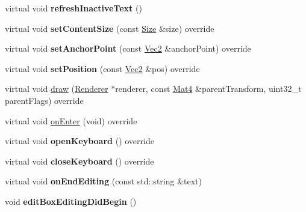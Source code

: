 \begin{DoxyCompactItemize}
virtual void {\bfseries refresh\+Inactive\+Text} ()
\item 
\mbox{\label{classui_1_1EditBoxImplCommon_a924b2b710c323759223e37d03998a4d1}} 
virtual void {\bfseries set\+Content\+Size} (const \hyperlink{classSize}{Size} \&size) override
\item 
\mbox{\label{classui_1_1EditBoxImplCommon_a0ac6bf4e36e02e29fae142b5c72e987f}} 
virtual void {\bfseries set\+Anchor\+Point} (const \hyperlink{classVec2}{Vec2} \&anchor\+Point) override
\item 
\mbox{\label{classui_1_1EditBoxImplCommon_a5d432d7249a3f36d2f73b111a89b5898}} 
virtual void {\bfseries set\+Position} (const \hyperlink{classVec2}{Vec2} \&pos) override
\item 
virtual void \hyperlink{classui_1_1EditBoxImplCommon_a7a0f13f9b474b83b43aa357a3fd123ca}{draw} (\hyperlink{classRenderer}{Renderer} $\ast$renderer, const \hyperlink{classMat4}{Mat4} \&parent\+Transform, uint32\+\_\+t parent\+Flags) override
\item 
virtual void \hyperlink{classui_1_1EditBoxImplCommon_af69080c62e8be3ded9074a1e891761e7}{on\+Enter} (void) override
\item 
\mbox{\label{classui_1_1EditBoxImplCommon_a7d61be98949f6b9c82665dde11068613}} 
virtual void {\bfseries open\+Keyboard} () override
\item 
\mbox{\label{classui_1_1EditBoxImplCommon_aab5ebed20a681171de342107d87419d2}} 
virtual void {\bfseries close\+Keyboard} () override
\item 
\mbox{\label{classui_1_1EditBoxImplCommon_a1df95d5a9ac8f68b183e2ed165440027}} 
virtual void {\bfseries on\+End\+Editing} (const std\+::string \&text)
\item 
\mbox{\label{classui_1_1EditBoxImplCommon_adbe1629e82e8aa3ff37151e0ef75de5d}} 
void {\bfseries edit\+Box\+Editing\+Did\+Begin} ()
\item 
\mbox{\label{classui_1_1EditBoxImplCommon_a7c70d9e42fa1a4550c34107c08e67ef1}} 

\end{DoxyCompactItemize}
